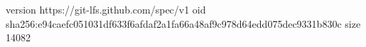 version https://git-lfs.github.com/spec/v1
oid sha256:e94caefc051031df633f6afdaf2a1fa66a48af9c978d64edd075dec9331b830c
size 14082
